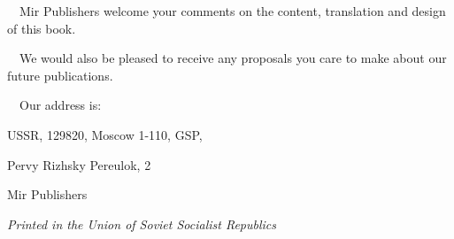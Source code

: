 \clearpage

\vspace*{5cm}

\parindent=10pt


\vspace*{0.5cm}

\begin{minipage}[c]{0.65\textwidth}

    $\quad$Mir Publishers welcome your comments on the content, translation and design of this book.

    $\quad$We would also be pleased to receive any proposals you care to make about our future publications.

    $\quad$Our address is:

    USSR, 129820, Moscow 1-110, GSP,

    Pervy Rizhsky Pereulok, 2

    Mir Publishers

\end{minipage}

\bigskip
\bigskip

\textit{Printed in the Union of Soviet Socialist Republics}

\vfill{ }

